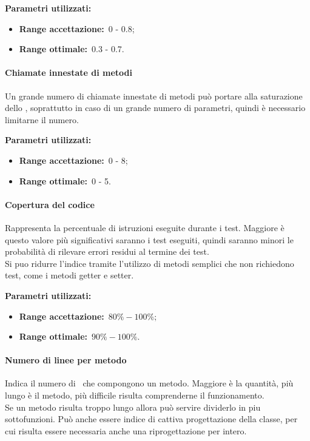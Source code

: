 				\textbf{Parametri utilizzati:}
				\begin{itemize}
					\item \textbf{Range accettazione:}\ 0 - 0.8;
					\item \textbf{Range ottimale:}\ 0.3 - 0.7.
				\end{itemize}
			\paragraph{Chiamate innestate di metodi}
				\label{sec:3.7.3.6}
				Un grande numero di chiamate innestate di metodi può portare alla saturazione dello , soprattutto in caso di un grande numero di parametri, quindi è necessario limitarne il numero.
				
				\textbf{Parametri utilizzati:}
				\begin{itemize}
					\item \textbf{Range accettazione:}\ 0 - 8;
					\item \textbf{Range ottimale:}\ 0 - 5.
				\end{itemize}
			\paragraph{Copertura del codice}
				\label{sec:3.7.3.7}
				Rappresenta la percentuale di istruzioni eseguite durante i test. Maggiore è questo valore più significativi saranno i test eseguiti, quindi saranno minori le probabilità di rilevare errori residui al termine dei test. \\
				Si puo ridurre l'indice tramite l'utilizzo di metodi semplici che non richiedono test, come i metodi getter e setter.
				
				\textbf{Parametri utilizzati:}
				\begin{itemize}
					\item \textbf{Range accettazione:}\ $80\% - 100\%;$
					\item \textbf{Range ottimale:}\ $90\% - 100\%.$
				\end{itemize}
			\paragraph{Numero di linee per metodo}
				\label{sec:3.7.3.8}
				Indica il numero di \ che compongono un metodo. Maggiore è la quantità, più lungo è il metodo, più difficile risulta comprenderne il funzionamento. \\
				Se un metodo risulta troppo lungo allora può servire dividerlo in piu sottofunzioni. Può anche essere indice di cattiva progettazione della classe, per cui risulta essere necessaria anche una riprogettazione per intero.
				
